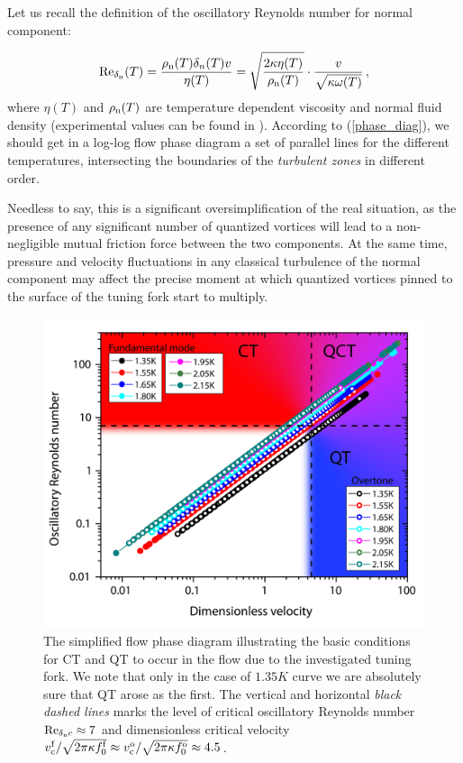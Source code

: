 Let us recall the definition of the oscillatory Reynolds number for normal component:

\begin{equation}
	\text{Re}_{\delta_{\mathrm{n}}}(T) = \frac{\rho_{\mathrm{n}}(T)\delta_{n}(T) v}{\eta(T)}
	= \sqrt{\frac{2\kappa\eta(T)}{\rho_{\mathrm{n}}(T)}}\cdot \frac{v}{\sqrt{\kappa \omega(T)}}\,,
	\label{phase_diag}
\end{equation}
where $ \eta(T) $ and $ \rho_{\mathrm{n}}(T) $ are temperature dependent viscosity and normal fluid density (experimental values can be found in \cite{donnelly}). According to (\ref{phase_diag}), we should get in a log-log flow phase diagram a set of parallel lines for the different temperatures, intersecting the boundaries of the \textit{turbulent zones} in different order.

Needless to say, this is a significant oversimplification of the real situation, as the presence of any significant number of quantized vortices will lead to a non-negligible mutual friction force between the two components. At the same time, pressure and velocity fluctuations in any classical turbulence of the normal component may affect the precise moment at which quantized vortices pinned to the surface of the tuning fork start to multiply.

\begin{figure}[h!]
	\centering
	\includegraphics[width=1\textwidth]{graphs/FlowPhase_diagram}
	\caption{The simplified flow phase diagram illustrating the basic conditions for CT and QT to occur in the flow due to the investigated tuning fork. We note that only in the case of $ 1.35\unit{K} $ curve we are absolutely sure that QT arose as the first. The vertical and horizontal \textit{black dashed lines} marks the level of critical oscillatory Reynolds number $ \text{Re}_{\delta_{\mathrm{n}}c}\approx 7$ and dimensionless critical velocity $ v_{\mathrm{c}}^{\mathrm{f}}/\sqrt{2\pi \kappa f_0^{\mathrm{f}}} \approx v_{\mathrm{c}}^{\mathrm{o}}/\sqrt{2\pi \kappa f_0^{\mathrm{o}}} \approx 4.5$. }
\end{figure}

